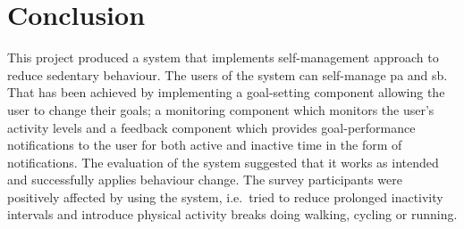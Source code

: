 \section{Conclusion}
This project produced a system that implements self-management approach to reduce sedentary behaviour. The users of the system can self-manage \gls{pa} and \gls{sb}. That has been achieved by implementing a goal-setting component allowing the user to change their goals; a monitoring component which monitors the user's activity levels and a feedback component which provides goal-performance notifications to the user for both active and inactive time in the form of notifications. The evaluation of the system suggested that it works as intended and successfully applies behaviour change. The survey participants were positively affected by using the system, i.e.\ tried to reduce prolonged inactivity intervals and introduce physical activity breaks doing walking, cycling or running.